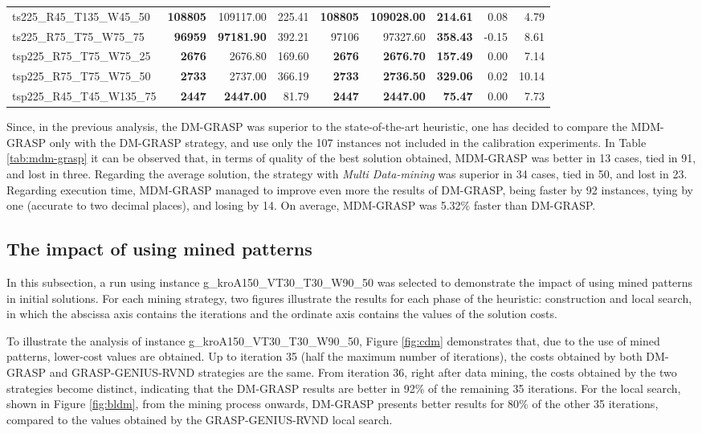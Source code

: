 \documentclass{singlecol-new}
\begin{document}
\begin{scriptsize}
\begin{longtable}{lrrrrrrrr}
		ts225\_R45\_T135\_W45\_50 & \textbf{108805} & 109117.00 & 225.41 & \textbf{108805} & \textbf{109028.00} & \textbf{214.61} & 0.08 & 4.79 \\
		ts225\_R75\_T75\_W75\_75 & \textbf{96959} & \textbf{97181.90} & 392.21 & 97106 & 97327.60 & \textbf{358.43} & -0.15 & 8.61 \\
		tsp225\_R75\_T75\_W75\_25 & \textbf{2676} & 2676.80 & 169.60 & \textbf{2676} & \textbf{2676.70} & \textbf{157.49} & 0.00 & 7.14 \\
		tsp225\_R75\_T75\_W75\_50 & \textbf{2733} & 2737.00 & 366.19 & \textbf{2733} & \textbf{2736.50} & \textbf{329.06} & 0.02 & 10.14 \\
		tsp225\_R45\_T45\_W135\_75 & \textbf{2447} & \textbf{2447.00} & 81.79 & \textbf{2447} & \textbf{2447.00} & \textbf{75.47} & 0.00 & 7.73 \\
		\hline
	\end{longtable}
\end{scriptsize}

Since, in the previous analysis, the DM-GRASP was superior to the state-of-the-art heuristic, one has decided to compare the MDM-GRASP only with the DM-GRASP strategy, and use only the 107 instances not included in the calibration experiments. In Table \ref{tab:mdm-grasp} it can be observed that, in terms of quality of the best solution obtained, MDM-GRASP was better in 13 cases, tied in 91, and lost in three. Regarding the average solution, the strategy with \textit{Multi Data-mining} was superior in 34 cases, tied in 50, and lost in 23. Regarding execution time, MDM-GRASP managed to improve even more the results of DM-GRASP, being faster by 92 instances, tying by one (accurate to two decimal places), and losing by 14. On average, MDM-GRASP was 5.32\% faster than DM-GRASP.


\subsection{The impact of using mined patterns}

In this subsection, a run using instance g\_kroA150\_VT30\_T30\_W90\_50 was selected to demonstrate the impact of using mined patterns in initial solutions. For each mining strategy, two figures illustrate the results for each phase of the heuristic: construction and local search, in which the abscissa axis contains the iterations and the ordinate axis contains the values of the solution costs.

To illustrate the analysis of instance g\_kroA150\_VT30\_T30\_W90\_50, Figure \ref{fig:cdm} demonstrates that, due to the use of mined patterns, lower-cost values are obtained. Up to iteration 35 (half the maximum number of iterations), the costs obtained by both DM-GRASP and GRASP-GENIUS-RVND strategies are the same. From iteration 36, right after data mining, the costs obtained by the two strategies become distinct, indicating that the DM-GRASP results are better in 92\% of the remaining 35 iterations. For the local search, shown in Figure \ref{fig:bldm}, from the mining process onwards, DM-GRASP presents better results for 80\% of the other 35 iterations, compared to the values obtained by the GRASP-GENIUS-RVND local search.
\end{document}
